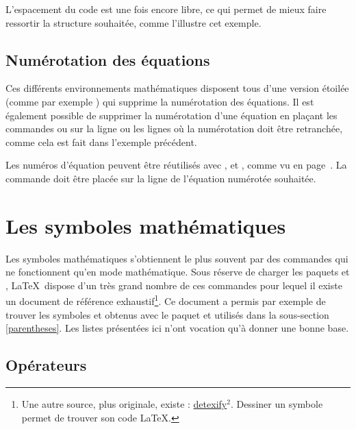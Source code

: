 L'espacement du code est une fois encore libre, ce qui permet de mieux faire ressortir la structure souhaitée, comme l'illustre cet exemple.

\subsection{Numérotation des équations}

Ces différents environnements mathématiques disposent tous d'une version étoilée (comme par exemple ) qui supprime la numérotation des équations. Il est également possible de supprimer la numérotation d'une équation en plaçant les commandes  ou  sur la ligne ou les lignes où la numérotation doit être retranchée, comme cela est fait dans l'exemple précédent. 

Les numéros d'équation peuvent être réutilisés avec ,  et , comme vu en page~\pageref{référence}. La commande  doit être placée sur la ligne de l'équation numérotée souhaitée.


\section{Les symboles mathématiques}

Les symboles mathématiques s'obtiennent le plus souvent par des commandes qui ne fonctionnent qu'en mode mathématique. Sous réserve de charger les paquets  et , \LaTeX\ dispose d'un très grand nombre de ces commandes pour lequel il existe un document de référence exhaustif\cite{paki}\footnote{Une autre source, plus originale, existe : \href{http://detexify.kirelabs.org/classify.html}{detexify$^2$}. Dessiner un symbole permet de trouver son code \LaTeX.}. Ce document a permis par exemple de trouver les symboles  et  obtenus avec le paquet  et utilisés dans la sous-section \ref{parentheses}. Les listes présentées ici n'ont vocation qu'à donner une bonne base.

\subsection{Opérateurs}

